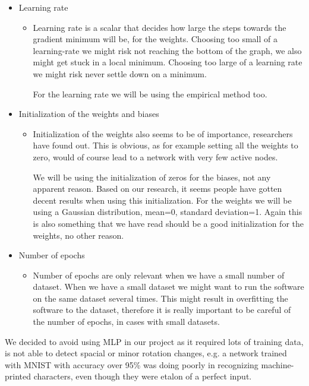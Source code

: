\documentclass[Report.tex]{subfiles}
\begin{document}
\begin{flushleft}
\begin{itemize}
\begin{itemize}
   \end{itemize}
   \item{Learning rate}
   \begin{itemize}
    \item{Learning rate is a scalar that decides how large the steps towards the gradient minimum will be, for the weights. Choosing too small of a learning-rate we might risk not reaching the bottom of the graph, we also might get stuck in a local minimum. Choosing too large of a learning rate we might risk never settle down on a minimum. \par
    For the learning rate we will be using the empirical method too.}
   \end{itemize}
   \item{Initialization of the weights and biases}
   \begin{itemize}
    \item{Initialization of the weights also seems to be of importance, researchers have found out. This is obvious, as for example setting all the weights to zero, would of course lead to a network with very few active nodes. \par
    We will be using the initialization of zeros for the biases, not any apparent reason. Based on our research, it seems people have gotten decent results when using this initialization. For the weights we will be using a Gaussian distribution, mean=0, standard deviation=1. Again this is also something that we have read should be a good initialization for the weights, no other reason.}
   \end{itemize}
   \item{Number of epochs}
   \begin{itemize}
    \item{Number of epochs are only relevant when we have a small number of dataset. When we have a small dataset we might want to run the software on the same dataset several times. This might result in overfitting the software to the dataset, therefore it is really important to be careful of the number of epochs, in cases with small datasets.}
   \end{itemize}
  \end{itemize}
\end{flushleft}

\begin{flushleft}
We decided to avoid using MLP in our project as it required lots of training data, is not able to detect spacial or minor rotation changes, e.g. a network trained with MNIST with accuracy over 95\% was doing poorly in recognizing machine-printed characters, even though they were etalon of a perfect input.

\end{flushleft}
\end{document}
